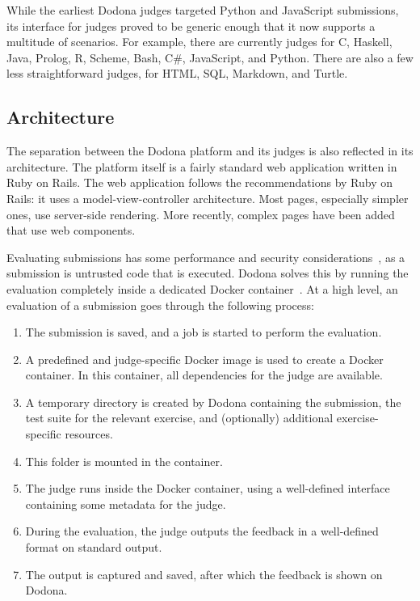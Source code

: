 \documentclass[../main]{subfiles}
\begin{document}
While the earliest Dodona judges targeted Python and JavaScript submissions, its interface for judges proved to be generic enough that it now supports a multitude of scenarios.
For example, there are currently judges for C, Haskell, Java, Prolog, R, Scheme, Bash, C\#, JavaScript, and Python.
There are also a few less straightforward judges, for HTML, SQL, Markdown, and Turtle.

\subsection{Architecture}\label{subsec:architecture}

The separation between the Dodona platform and its judges is also reflected in its architecture.
The platform itself is a fairly standard web application written in Ruby on Rails.
The web application follows the recommendations by Ruby on Rails: it uses a model-view-controller architecture.
Most pages, especially simpler ones, use server-side rendering.
More recently, complex pages have been added that use web components.

Evaluating submissions has some performance and security considerations~\autocite{wasikSurveyOnlineJudge2018}, as a submission is untrusted code that is executed.
Dodona solves this by running the evaluation completely inside a dedicated Docker container~\autocite{pevelerComparingJailedSandboxes2019}.
At a high level, an evaluation of a submission goes through the following process:
\begin{enumerate}[noitemsep]
    \item The submission is saved, and a job is started to perform the evaluation.
    \item A predefined and judge-specific Docker image is used to create a Docker container.
          In this container, all dependencies for the judge are available.
    \item A temporary directory is created by Dodona containing the submission, the test suite for the relevant exercise, and (optionally) additional exercise-specific resources.
    \item This folder is mounted in the container.
    \item The judge runs inside the Docker container, using a well-defined interface containing some metadata for the judge.
    \item During the evaluation, the judge outputs the feedback in a well-defined format on standard output.
    \item The output is captured and saved, after which the feedback is shown on Dodona.
\end{enumerate}
\end{document}
